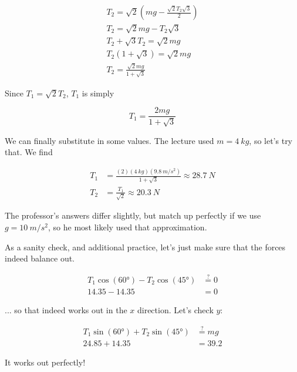 \begin{align}
T_2 = \sqrt{2}\left(m g - \frac{\sqrt{2} T_2 \sqrt{3}}{2}\right)\\
T_2 = \sqrt{2} m g - T_2 \sqrt{3}\\
T_2 + \sqrt{3} T_2 = \sqrt{2} m g\\
T_2 (1 + \sqrt{3}) = \sqrt{2} m g\\
T_2 = \frac{\sqrt{2} m g}{1 + \sqrt{3}}
\end{align}

Since $T_1 = \sqrt{2} T_2$, $T_1$ is simply

\begin{equation}
T_1 = \frac{2 m g}{1 + \sqrt{3}}
\end{equation}

We can finally substitute in some values. The lecture used $m = \SI{4}{kg}$, so let's try that. We find

\begin{align}
T_1 &= \frac{(2)(\SI{4}{kg})(\SI{9.8}{m/s^2})}{1 + \sqrt{3}} \approx \SI{28.7}{N}\\
T_2 &= \frac{T_1}{\sqrt{2}} \approx \SI{20.3}{N}
\end{align}

The professor's answers differ slightly, but match up perfectly if we use $g = \SI{10}{m/s^2}$, so he most likely used that approximation.

As a sanity check, and additional practice, let's just make sure that the forces indeed balance out.

\begin{align}
T_1 \cos(\ang{60}) - T_2 \cos(\ang{45}) &\overset{?}{=} 0\\
14.35 - 14.35 &= 0
\end{align}

... so that indeed works out in the $x$ direction. Let's check $y$:

\begin{align}
T_1 \sin(\ang{60}) + T_2 \sin(\ang{45}) &\overset{?}{=} m g\\
24.85 + 14.35 &= 39.2
\end{align}

It works out perfectly!

